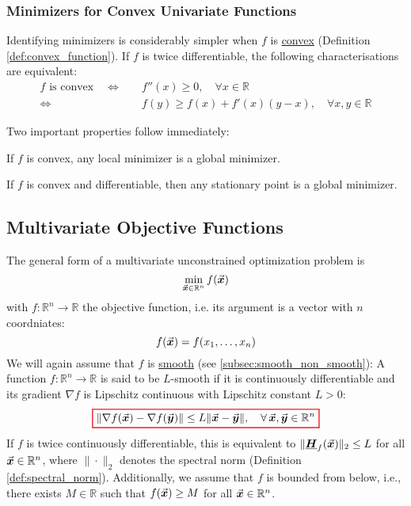 \subsubsection{Minimizers for Convex Univariate Functions}
Identifying minimizers is considerably simpler when \(f\) is \hyperref[def:convex_function]{convex} (Definition \ref{def:convex_function}). 
If \(f\) is twice differentiable, the following characterisations are equivalent:
\[
\begin{aligned}
f\text{ is convex} \quad \Longleftrightarrow & \quad f''(x)\ge0,\quad \forall x\in\mathbb{R}\\[1mm]
\Longleftrightarrow & \quad f(y)\ge f(x)+f'(x)(y-x),\quad \forall x,y\in\mathbb{R}
\end{aligned}
\]

Two important properties follow immediately:

\begin{proposition}
If \(f\) is convex, any local minimizer is a global minimizer.
\end{proposition}

\begin{proposition}
If \(f\) is convex and differentiable, then any stationary point is a global minimizer.
\end{proposition}


\subsection{Multivariate Objective Functions}

The general form of a multivariate unconstrained optimization problem is
\[
\min_{\vec{\boldsymbol{x}}\in\mathbb{R}^n} f(\vec{\boldsymbol{x}})
\]
with \(f:\mathbb{R}^n\to\mathbb{R}\) the objective function, i.e. its argument is a vector with \(n\) coordniates:
\[
f(\vec{\boldsymbol{x}})=f(x_1, \ldots, x_n)
\]
We will again assume that \(f\) is \hyperref[subsec:smooth_non_smooth]{smooth} (see \ref{subsec:smooth_non_smooth}):
A function \(f:\mathbb{R}^n\to\mathbb{R}\) is said to be {\color{red}\(L\)-smooth} if it is continuously differentiable and its gradient \(\nabla f\) is Lipschitz continuous with Lipschitz constant \(L>0\):
\begin{equation}
  \label{eq:L-smoothness_multivariate}
  {\color{Red}
  \setlength{\fboxrule}{1pt}
  \boxed{ 
  \color{black}
\|\nabla f(\vect{x})-\nabla f(\vect{y})\|\le L\|\vect{x}-\vect{y}\|,\quad \forall\, \vect{x},\vect{y}\in\mathbb{R}^n %
  }
  }
\end{equation}
If \(f\) is twice continuously differentiable, this is equivalent to \(\|\underline{\boldsymbol{H}}_f(\vec{\boldsymbol{x}})\|_{2}\le L\) for all \(\vec{\boldsymbol{x}}\in\mathbb{R}^n\), where \(\|\cdot\|_{2}\) denotes the spectral norm (Definition \ref{def:spectral_norm}).
Additionally, we assume that \(f\) is bounded from below, i.e., there exists \(M\in\mathbb{R}\) such that \(f(\vec{\boldsymbol{x}})\ge M\) for all \(\vec{\boldsymbol{x}}\in\mathbb{R}^n\).





